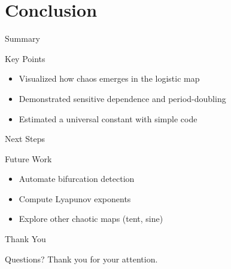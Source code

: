 \documentclass{beamer}
\begin{document}
\section{Conclusion}
\begin{frame}{Summary}
  \begin{block}{Key Points}
    \begin{itemize}
      \item Visualized how chaos emerges in the logistic map
      \item Demonstrated sensitive dependence and period-doubling
      \item Estimated a universal constant with simple code
    \end{itemize}
  \end{block}
\end{frame}

\begin{frame}{Next Steps}
  \begin{block}{Future Work}
    \begin{itemize}
      \item Automate bifurcation detection
      \item Compute Lyapunov exponents
      \item Explore other chaotic maps (tent, sine)
    \end{itemize}
  \end{block}
\end{frame}

\begin{frame}{Thank You}
  \begin{block}{Questions?}
    \centering
    Thank you for your attention.
  \end{block}
\end{frame}
\end{document}
